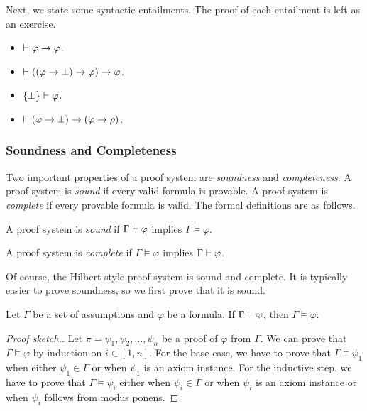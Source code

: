 \documentclass[11pt,usenames, dvipsnames]{article}
\begin{document}
Next, we state some syntactic entailments. The proof of each entailment is left as an exercise.

\begin{itemize}
  \item $\vdash \varphi \to \varphi$.
  \item $\vdash ((\varphi \to \bot) \to \varphi) \to \varphi$.
  \item $\{\bot\} \vdash \varphi$.
  \item $\vdash (\varphi \to \bot) \to (\varphi \to \rho)$.
\end{itemize}

\subsubsection{\large \centering Soundness and Completeness}
\noindent

Two important properties of a proof system are \emph{soundness} and \emph{completeness}. A proof system is \emph{sound} if every valid formula is provable. A proof system is \emph{complete} if every provable formula is valid. The formal definitions are as follows.

\begin{definition}[Soundness]
  A proof system is \emph{sound} if $\Gamma \vdash \varphi$ implies $\Gamma \models \varphi$.
\end{definition}

\begin{definition}[Completeness]
  A proof system is \emph{complete} if $\Gamma \models \varphi$ implies $\Gamma \vdash \varphi$.
\end{definition}

Of course, the Hilbert-style proof system is sound and complete. It is typically easier to prove soundness, so we first prove that it is sound.

\begin{theorem}
  Let $\Gamma$ be a set of assumptions and $\varphi$ be a formula. If $\Gamma \vdash \varphi$, then $\Gamma \models \varphi$.
\end{theorem}

\begin{proof}[Proof sketch.]
  Let $\pi = \psi_1, \psi_2, \ldots, \psi_n$ be a proof of $\varphi$ from $\Gamma$. We can prove that $\Gamma \models \varphi$ by induction on $i \in [1, n]$. For the base case, we have to prove that $\Gamma \models \psi_1$ when either $\psi_1 \in \Gamma$ or when $\psi_1$ is an axiom instance. For the inductive step, we have to prove that $\Gamma \models \psi_i$ either when $\psi_i \in \Gamma$ or when $\psi_i$ is an axiom instance or when $\psi_i$ follows from modus ponens.
\end{proof}
\end{document}
